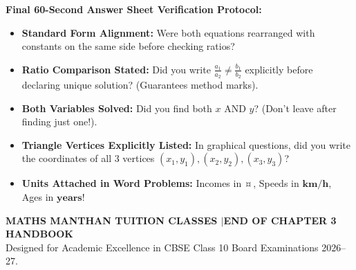 \documentclass[10pt,a4paper]{article}
\begin{document}
\begin{successBox}[top=1.2mm,bottom=1.2mm,before skip=1.5pt,after skip=1pt]
  \textbf{Final 60-Second Answer Sheet Verification Protocol:}
  \begin{itemize}[leftmargin=4mm,itemsep=1pt,topsep=1pt,parsep=0pt]
    \item[$\square$] \textbf{Standard Form Alignment:} Were both equations rearranged with constants on the same side before checking ratios?
    \item[$\square$] \textbf{Ratio Comparison Stated:} Did you write $\frac{a_1}{a_2} \neq \frac{b_1}{b_2}$ explicitly before declaring unique solution? (Guarantees method marks).
    \item[$\square$] \textbf{Both Variables Solved:} Did you find both $x$ AND $y$? (Don't leave after finding just one!).
    \item[$\square$] \textbf{Triangle Vertices Explicitly Listed:} In graphical questions, did you write the coordinates of all 3 vertices $(x_1, y_1), (x_2, y_2), (x_3, y_3)$?
    \item[$\square$] \textbf{Units Attached in Word Problems:} Incomes in $\mathbf{\text{\textcurrency}}$, Speeds in $\mathbf{\text{km/h}}$, Ages in $\mathbf{\text{years}}$!
  \end{itemize}
\end{successBox}

\vfill
\begin{center}
  {\footnotesize\bfseries\color{primary}MATHS MANTHAN TUITION CLASSES \quad$\vert$\quad END OF CHAPTER 3 HANDBOOK}\\[1mm]
  {\scriptsize\color{secondary}Designed for Academic Excellence in CBSE Class 10 Board Examinations 2026--27.}
\end{center}
\end{document}
